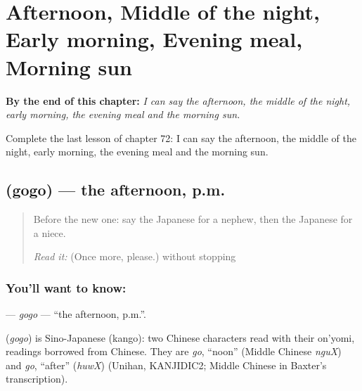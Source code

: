 
\chapter{Afternoon, Middle of the night, Early morning, Evening meal, Morning sun}
\label{ch:ja-afternoon-middle-of-the-night-early-morning-evening-meal-morning-sun}

\begin{chapteropening}
\textbf{By the end of this chapter:} \emph{I can say the afternoon, the middle of the night, early morning, the evening meal and the morning sun.}

Complete the last lesson of chapter 72: I can say the afternoon, the middle of the night, early morning, the evening meal and the morning sun.
\end{chapteropening}

\section[\texorpdfstring{\ja{ごご} (gogo)}{ごご (gogo)}]{ (gogo) — the afternoon, p.m.}

\label{lesson:JA-C72-gogo}



\begin{quote}
Before the new one: say the Japanese for a nephew, then the Japanese for a niece.

\emph{Read it:} \textbf{} (Once more, please.) without stopping
\end{quote}

\subsection*{You'll want to know: }
\textbf{} — \emph{gogo} — \textquotedblleft{}the afternoon, p.m.\textquotedblright{}.

\begin{cousinweb}
\textbf{} (\emph{gogo}) is Sino-Japanese (kango): two Chinese characters read with their on'yomi, readings borrowed from Chinese. They are \emph{go}, \textquotedblleft{}noon\textquotedblright{} (Middle Chinese \emph{nguX}) and \emph{go}, \textquotedblleft{}after\textquotedblright{} (\emph{huwX}) (Unihan, KANJIDIC2; Middle Chinese in Baxter's transcription).
\end{cousinweb}

